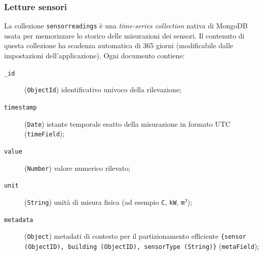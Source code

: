     \subsubsection{Letture sensori}
        La collezione \texttt{sensorreadings} è una \emph{time-series
        collection} nativa di MongoDB usata per memorizzare lo storico delle misurazioni dei
        sensori. Il contenuto di questa collezione ha scadenza automatica di 365 giorni (modificabile dalle impostazioni dell'applicazione). Ogni documento contiene:
        \begin{description}
            \item[\texttt{\_id}] (\texttt{ObjectId}) identificativo univoco della rilevazione;
            \item[\texttt{timestamp}] (\texttt{Date}) istante temporale esatto della misurazione in formato UTC (\texttt{timeField});
            \item[\texttt{value}] (\texttt{Number}) valore numerico rilevato;
            \item[\texttt{unit}] (\texttt{String}) unità di misura fisica (ad esempio \texttt{\textdegree C}, \texttt{kW}, \texttt{m$^3$});
            \item[\texttt{metadata}] (\texttt{Object}) metadati di contesto per il partizionamento efficiente \texttt{\{sensor (ObjectID), building (ObjectID), sensorType (String)\}} (\texttt{metaField});
        \end{description}
